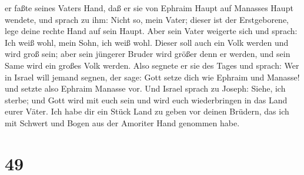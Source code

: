 er faßte seines Vaters Hand, daß er sie von Ephraim Haupt auf Manasses
Haupt wendete,  und sprach zu ihm: Nicht so, mein Vater;
dieser ist der Erstgeborene, lege deine rechte Hand auf sein Haupt.
 Aber sein Vater weigerte sich und sprach: Ich weiß wohl,
mein Sohn, ich weiß wohl. Dieser soll auch ein Volk werden und wird groß
sein; aber sein jüngerer Bruder wird größer denn er werden, und sein
Same wird ein großes Volk werden.  Also segnete er sie des
Tages und sprach: Wer in Israel will jemand segnen, der sage: Gott setze
dich wie Ephraim und Manasse! und setzte also Ephraim Manasse vor.
 Und Israel sprach zu Joseph: Siehe, ich sterbe; und Gott
wird mit euch sein und wird euch wiederbringen in das Land eurer Väter.
 Ich habe dir ein Stück Land zu geben vor deinen Brüdern,
das ich mit Schwert und Bogen aus der Amoriter Hand genommen habe.

\hypertarget{section-48}{%
\section{49}\label{section-48}}

